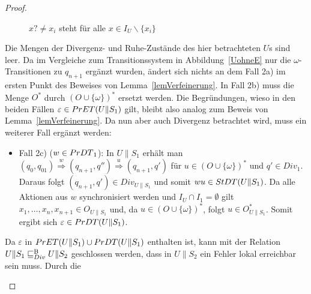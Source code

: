 \begin{proof}
\begin{itemize}
\begin{figure} [h!tbp]
\begin{center}
        \caption{$x?\neq x_i$ steht für alle $x\in I_U\backslash\{x_i\}$}
\label{UohneEmitO}
      \end{center}
      \end{figure}
      Die Mengen der Divergenz- und Ruhe-Zustände des hier betrachteten $U$s
      sind leer. Da im Vergleiche zum Transitionssystem in
      Abbildung~\ref{UohneE} nur die $\omega$-Transitionen zu $q_{n+1}$ ergänzt
      wurden, ändert sich nichts an dem Fall 2a) im ersten Punkt des Beweises
      von Lemma~\ref{lemVerfeinerung}. In Fall 2b) muss die Menge
      $O^*$ durch $(O\cup \{\omega\})^*$ ersetzt werden. Die Begründungen,
      wieso in den beiden Fällen $\varepsilon\in PrET{}(U\|S_1)$ gilt, bleibt
      also analog zum Beweis von Lemma~\ref{lemVerfeinerung}. Da nun aber auch
      Divergenz betrachtet wird, muss ein weiterer Fall ergänzt werden:
      \begin{itemize}
        \item Fall 2c) ($w\in PrDT{}_1$): In $U\|S_1$ erhält man $(q_0,q_{01})
          \overset{w}{\Rightarrow} (q_{n+1},q'') \overset{u}{\Rightarrow}
          (q_{n+1},q')$ für $u\in (O\cup \{\omega\})^*$ und $q'\in Div_1$.
          Daraus folgt $(q_{n+1},q')\in Div_{U\|S_1}$ und somit $wu\in
          StDT{}(U\|S_1)$. Da alle Aktionen aus $w$ synchronisiert werden und
          $I_U\cap I_1 = \emptyset$ gilt
          $x_1,\dots ,x_n,x_{n+1}\in O_{U\|S_1}$ und, da $u\in (O\cup
          \{\omega\})^*$, folgt $u\in O_{U\|S_1}^*$. Somit ergibt sich
          $\varepsilon\in PrDT{}(U\|S_1)$.
      \end{itemize}
      Da $\varepsilon$ in $PrET{}(U\|S_1)\cup PrDT{}(U\|S_1)$ enthalten
      ist, kann mit der Relation\linebreak $U\|S_1\sqsubseteq _{Div}^\mathrm{B} U\|S_2$ geschlossen werden, dass
      in $U\|S_2$ ein Fehler lokal erreichbar sein muss. Durch die

\end{itemize}
\end{proof}
